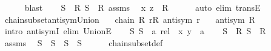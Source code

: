 \begin{isabellebody}
\ \ \ \ \isamarkupfalse%
\ blast\isanewline
\ \ \isamarkupfalse%
\ {\isacartoucheopen}S{}\ {\isasymin}\ R{\isacartoucheclose}\ {\isacartoucheopen}S{}\ {\isasymin}\ R{\isacartoucheclose}\ assms{\isacharparenleft}{\kern0pt}{}{\isacharparenright}{\kern0pt}\ \isamarkupfalse%
\ {\isachardoublequoteopen}{\isacharparenleft}{\kern0pt}x{\isacharcomma}{\kern0pt}\ z{\isacharparenright}{\kern0pt}\ {\isasymin}\ {\isasymUnion}R{\isachardoublequoteclose}\isanewline
\ \ \ \ \isamarkupfalse%
\ {\isacharparenleft}{\kern0pt}auto\ elim{\isacharcolon}{\kern0pt}\ transE{\isacharparenright}{\kern0pt}\isanewline
{}\isamarkupfalse%
%
\endisatagproof
{\isafoldproof}%
%
\isadelimproof
\isanewline
%
\endisadelimproof
\isanewline
{}\isamarkupfalse%
\ chain{\isacharunderscore}{\kern0pt}subset{\isacharunderscore}{\kern0pt}antisym{\isacharunderscore}{\kern0pt}Union{\isacharcolon}{\kern0pt}\isanewline
\ \ \ {\isachardoublequoteopen}chain\isactrlsub {\isasymsubseteq}\ R{\isachardoublequoteclose}\ {\isachardoublequoteopen}{\isasymforall}r{\isasymin}R{\isachardot}{\kern0pt}\ antisym\ r{\isachardoublequoteclose}\isanewline
\ \ \ {\isachardoublequoteopen}antisym\ {\isacharparenleft}{\kern0pt}{\isasymUnion}R{\isacharparenright}{\kern0pt}{\isachardoublequoteclose}\isanewline
%
\isadelimproof
%
\endisadelimproof
%
\isatagproof
{}\isamarkupfalse%
\ {\isacharparenleft}{\kern0pt}intro\ antisymI{\isacharcomma}{\kern0pt}\ elim\ UnionE{\isacharparenright}{\kern0pt}\isanewline
\ \ \isamarkupfalse%
\ S{}\ S{}\ {\isacharcolon}{\kern0pt}{\isacharcolon}{\kern0pt}\ {\isachardoublequoteopen}{\isacharprime}{\kern0pt}a\ rel{\isachardoublequoteclose}\ \ x\ y\ {\isacharcolon}{\kern0pt}{\isacharcolon}{\kern0pt}\ {\isacharprime}{\kern0pt}a\isanewline
\ \ \isamarkupfalse%
\ {\isachardoublequoteopen}S{}\ {\isasymin}\ R{\isachardoublequoteclose}\ {\isachardoublequoteopen}S{}\ {\isasymin}\ R{\isachardoublequoteclose}\isanewline
\ \ \isamarkupfalse%
\ assms{\isacharparenleft}{\kern0pt}{}{\isacharparenright}{\kern0pt}\ \isamarkupfalse%
\ {\isachardoublequoteopen}S{}\ {\isasymsubseteq}\ S{}\ {\isasymor}\ S{}\ {\isasymsubseteq}\ S{}{\isachardoublequoteclose}\isanewline
\ \ \ \ \isamarkupfalse%
\ chain{\isacharunderscore}{\kern0pt}subset{\isacharunderscore}{\kern0pt}def\ \isamarkupfalse%

\end{isabellebody}

